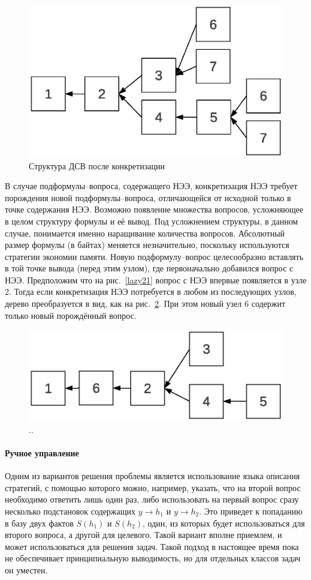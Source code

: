 \begin{figure}[h]
	\centering
	\includegraphics[width=0.5\linewidth]{pics/Lazy22.eps}
	\caption{Структура ДСВ после конкретизации}
	\label{lazy22}
\end{figure}

В случае подформулы--вопроса, содержащего НЭЭ, конкретизация НЭЭ требует порождения новой подформулы--вопроса, отличающейся от исходной только в точке содержания НЭЭ. Возможно появление множества вопросов, усложняющее в целом структуру формулы и её вывод. Под усложнением структуры, в данном случае, понимается именно наращивание количества вопросов. Абсолютный размер формулы (в байтах) меняется незначительно, поскольку используются стратегии экономии памяти. Новую подформулу--вопрос целесообразно вставлять в той точке вывода (перед этим узлом), где первоначально добавился вопрос с НЭЭ. Предположим что на рис.~\ref{lazy21} вопрос с НЭЭ впервые появляется в узле 2. Тогда если конкретизация НЭЭ потребуется в любом из последующих узлов, дерево преобразуется в вид, как на рис.~\ref{lazy23}. При этом новый узел 6 содержит только новый порождённый вопрос.
\begin{figure}[h]
	\centering
	\includegraphics[width=0.5\linewidth]{pics/Lazy23.eps}
	\caption{..}
	\label{lazy23}
\end{figure}

\paragraph{Ручное управление}
Одним из вариантов решения проблемы является использование языка описания стратегий, с помощью которого можно, например, указать, что на второй вопрос необходимо ответить лишь один раз, либо использовать на первый вопрос сразу несколько подстановок содержащих $y\rightarrow h_1$ и $y\rightarrow h_2$. Это приведет к попаданию в базу двух фактов $S(h_1)$ и $S(h_2)$, один, из которых будет использоваться для второго вопроса, а другой для целевого. Такой вариант вполне приемлем, и может использоваться для решения задач. Такой подход в настоящее время пока не обеспечивает принципиальную выводимость, но для отдельных классов задач он уместен. %

